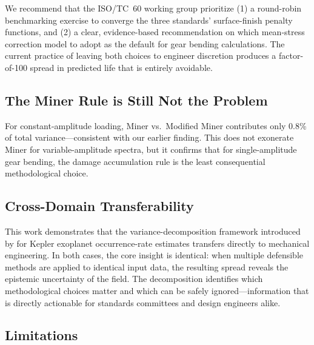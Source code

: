 \documentclass[12pt,a4paper]{article}
\begin{document}
We recommend that the ISO/TC~60 working group prioritize (1) a
round-robin benchmarking exercise to converge the three standards'
surface-finish penalty functions, and (2) a clear, evidence-based
recommendation on which mean-stress correction model to adopt as the
default for gear bending calculations. The current practice of leaving
both choices to engineer discretion produces a factor-of-100
spread in predicted life that is entirely avoidable.

\subsection{The Miner Rule is Still Not the Problem}

For constant-amplitude loading, Miner vs.\ Modified Miner contributes
only 0.8\% of total variance---consistent with our earlier finding.
This does not exonerate Miner for variable-amplitude spectra, but it
confirms that for single-amplitude gear bending, the damage accumulation
rule is the least consequential methodological choice.

\subsection{Cross-Domain Transferability}

This work demonstrates that the variance-decomposition framework
introduced by \citet{chen2026etaearth} for Kepler exoplanet
occurrence-rate estimates transfers directly to mechanical engineering.
In both cases, the core insight is identical: when multiple defensible
methods are applied to identical input data, the resulting spread
reveals the epistemic uncertainty of the field. The decomposition
identifies which methodological choices matter and which can be safely
ignored---information that is directly actionable for standards
committees and design engineers alike.

\subsection{Limitations}
\end{document}
